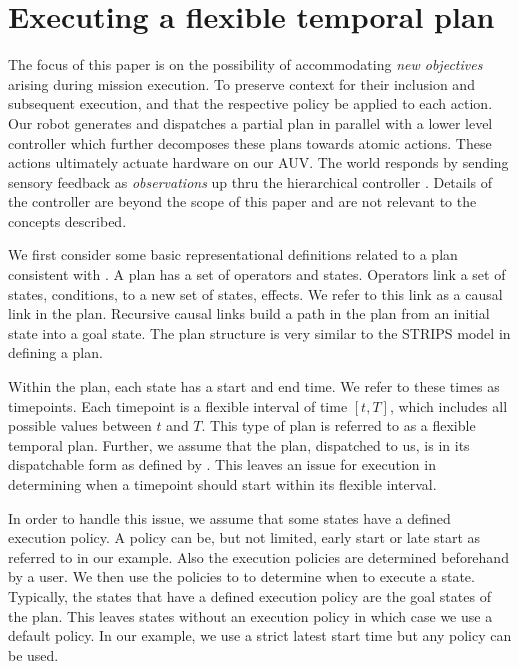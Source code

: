 \section{Executing a flexible temporal plan}
\label{sec: defs}

The focus of this paper is on the possibility of accommodating \emph{new
  objectives} arising during mission execution. 
To preserve context for their inclusion and subsequent execution, and
that the respective policy be applied to each action. Our robot generates and
dispatches a partial plan in parallel with a lower level controller
which further decomposes these plans towards atomic actions. These
actions ultimately actuate hardware on our AUV. The world responds by
sending sensory feedback as \emph{observations} up thru the
hierarchical controller \cite{mcgann08bdup,rajan12dup}. Details of the
controller are beyond the scope of this paper and are not relevant to the
concepts described. 

We first consider some basic representational definitions related to a plan
consistent with \cite{Nau:2004}. A plan has a set of operators and states.
Operators link a set of states, conditions, to a new set of states, effects. We 
refer to this link as a causal link in the plan. Recursive causal links build a path
in the plan from an initial state into a goal state. The plan structure is very similar to the
STRIPS model in defining a plan. 

Within the plan, each state has a start and end time. We refer to
these times as timepoints. Each timepoint is a flexible interval of time $[t, T]$, which
includes all possible values between $t$ and $T$.  This type of plan is referred to as 
a flexible temporal plan. Further, we assume that the
plan, dispatched to us, is in its dispatchable form as defined by \cite{mus98a}.  This leaves an issue 
for execution in determining when a timepoint should start within its flexible interval.

In order to handle this issue, we assume that some states have a defined execution policy. 
A policy can be, but not limited, early start or late start as referred to in our example.  Also the
execution policies are determined beforehand by a user. We then use the policies to 
to determine when to execute a state. Typically, the states that have a defined
execution policy are the goal states of the plan. This leaves states without an execution policy
in which case we use a default policy. In our example, we use a strict latest start time but any policy can 
be used. 


